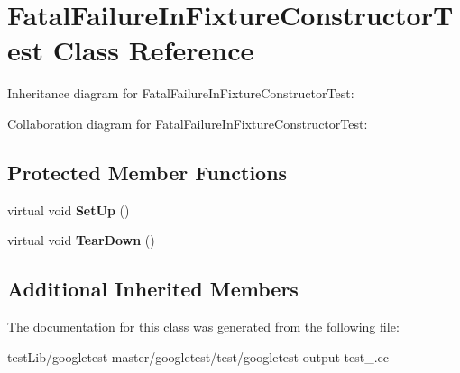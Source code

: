 \hypertarget{classFatalFailureInFixtureConstructorTest}{}\section{Fatal\+Failure\+In\+Fixture\+Constructor\+Test Class Reference}
\label{classFatalFailureInFixtureConstructorTest}


Inheritance diagram for Fatal\+Failure\+In\+Fixture\+Constructor\+Test\+:


Collaboration diagram for Fatal\+Failure\+In\+Fixture\+Constructor\+Test\+:
\subsection*{Protected Member Functions}
\begin{DoxyCompactItemize}
\item 
\mbox{\label{classFatalFailureInFixtureConstructorTest_a006d3ac0e7a4ad3c469c3b41dc7c42c3}} 
virtual void {\bfseries Set\+Up} ()
\item 
\mbox{\label{classFatalFailureInFixtureConstructorTest_a2763026a557e1fce4e59bd16c4eced57}} 
virtual void {\bfseries Tear\+Down} ()
\end{DoxyCompactItemize}
\subsection*{Additional Inherited Members}


The documentation for this class was generated from the following file\+:\begin{DoxyCompactItemize}
\item 
test\+Lib/googletest-\/master/googletest/test/googletest-\/output-\/test\+\_\+.\+cc\end{DoxyCompactItemize}
